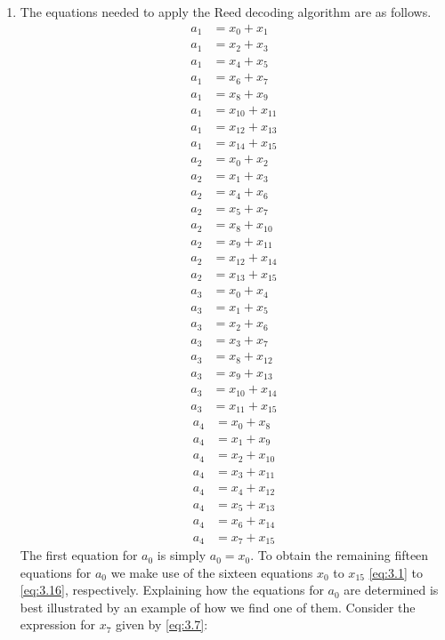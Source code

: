 \begin{enumerate}[label=(\roman*)]
\item The equations needed to apply the Reed decoding algorithm are as follows.
\begin{align}
	a_1 &= x_0 + x_1\\
	a_1 &= x_2 + x_3\\
	a_1 &= x_4 + x_5\\
	a_1 &= x_6 + x_7\\
	a_1 &= x_8 + x_9\\
	a_1 &= x_{10} + x_{11}\\
	a_1 &= x_{12} + x_{13}\\
	a_1 &= x_{14} + x_{15}
\end{align}
\begin{align}
	a_2 &= x_0 + x_2\\
	a_2 &= x_1 + x_3\\
	a_2 &= x_4 + x_6\\
	a_2 &= x_5 + x_7\\
	a_2 &= x_8 + x_{10}\\
	a_2 &= x_{9} + x_{11}\\
	a_2 &= x_{12} + x_{14}\\
	a_2 &= x_{13} + x_{15}
\end{align}
\begin{align}
	a_3 &= x_0 + x_4\\
	a_3 &= x_1 + x_5\\
	a_3 &= x_2 + x_6\\
	a_3 &= x_3 + x_7\\
	a_3 &= x_8 + x_{12}\\
	a_3 &= x_{9} + x_{13}\\
	a_3 &= x_{10} + x_{14}\\
	a_3 &= x_{11} + x_{15}
\end{align}
\begin{align}
	a_4 &= x_0 + x_8\\
	a_4 &= x_1 + x_9\\
	a_4 &= x_2 + x_{10}\\
	a_4 &= x_3 + x_{11}\\
	a_4 &= x_4 + x_{12}\\
	a_4 &= x_{5} + x_{13}\\
	a_4 &= x_{6} + x_{14}\\
	a_4 &= x_{7} + x_{15}
\end{align}
The first equation for $a_0$ is simply $a_0 = x_0$. To obtain the remaining fifteen equations for $a_0$ we make use of the sixteen equations $x_0$ to $x_{15}$ \eqref{eq:3.1} to \eqref{eq:3.16}, respectively. Explaining how the equations for $a_0$ are determined is best illustrated by an example of how we find one of them. Consider the expression for $x_7$ given by \eqref{eq:3.7}:


\end{enumerate}
